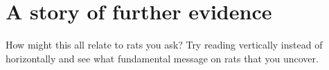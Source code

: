 \documentclass[twocolumn, twocolappendix]{aastex631}
\begin{document}


\appendix
\section*{A story of further evidence}

How might this all relate to rats you ask? Try reading vertically instead of horizontally and see what fundamental message on rats that you uncover.
\end{document}

